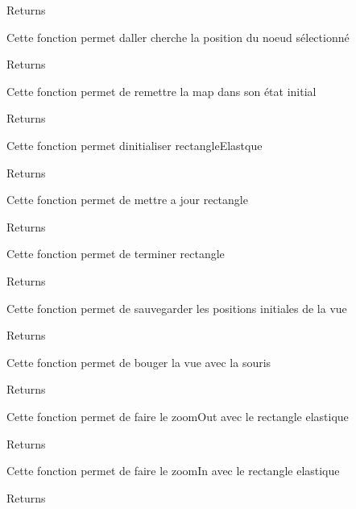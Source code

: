 \begin{DoxyReturn}{Returns}

\end{DoxyReturn}
Cette fonction permet d\textquotesingle{}aller cherche la position du noeud sélectionné

\begin{DoxyReturn}{Returns}

\end{DoxyReturn}
Cette fonction permet de remettre la map dans son état initial

\begin{DoxyReturn}{Returns}

\end{DoxyReturn}
Cette fonction permet d\textquotesingle{}initialiser rectangle\+Elastque

\begin{DoxyReturn}{Returns}

\end{DoxyReturn}
Cette fonction permet de mettre a jour rectangle

\begin{DoxyReturn}{Returns}

\end{DoxyReturn}
Cette fonction permet de terminer rectangle

\begin{DoxyReturn}{Returns}

\end{DoxyReturn}
Cette fonction permet de sauvegarder les positions initiales de la vue

\begin{DoxyReturn}{Returns}

\end{DoxyReturn}
Cette fonction permet de bouger la vue avec la souris

\begin{DoxyReturn}{Returns}

\end{DoxyReturn}
Cette fonction permet de faire le zoom\+Out avec le rectangle elastique

\begin{DoxyReturn}{Returns}

\end{DoxyReturn}
Cette fonction permet de faire le zoom\+In avec le rectangle elastique

\begin{DoxyReturn}{Returns}

\end{DoxyReturn}
\hypertarget{group__inf2990_gaf1099ad811d94b7ede2572fbd3c7c89e}{}
